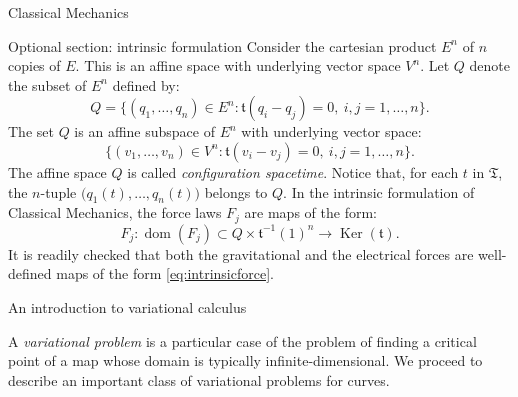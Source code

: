 \documentclass[oneside,a4paper,11pt]{amsbook}
\DeclareMathOperator{\Ker}{Ker}
\DeclareMathOperator{\Dom}{dom}
\theoremstyle{remark}\newtheorem{exercise}{Exercise}[chapter]
\theoremstyle{plain}\newtheorem{teo}{Theorem}[section]
\theoremstyle{plain}\newtheorem{lem}[teo]{Lemma}
\theoremstyle{plain}\newtheorem{prop}[teo]{Proposition}
\theoremstyle{plain}\newtheorem{cor}[teo]{Corollary}
\theoremstyle{definition}\newtheorem{defin}[teo]{Definition}
\theoremstyle{remark}\newtheorem{rem}[teo]{Remark}
\theoremstyle{definition}\newtheorem{notation}[teo]{Notation}
\theoremstyle{definition}\newtheorem{convention}[teo]{Convention}
\theoremstyle{definition}\newtheorem{example}[teo]{Example}
\numberwithin{section}{chapter}
\numberwithin{equation}{section}
\begin{document}
\begin{chapter}{Classical Mechanics}
\begin{section}{Optional section: intrinsic formulation}
Consider the cartesian product $E^n$ of $n$ copies of $E$. This is an affine space with underlying vector
space $V^n$. Let $Q$ denote the subset of $E^n$ defined by:
\[Q=\big\{(q_1,\ldots,q_n)\in E^n:\mathfrak t(q_i-q_j)=0,\ i,j=1,\ldots,n\big\}.\]
The set $Q$ is an affine subspace of $E^n$ with underlying vector space:
\[\big\{(v_1,\ldots,v_n)\in V^n:\mathfrak t(v_i-v_j)=0,\ i,j=1,\ldots,n\big\}.\]
The affine space $Q$ is called {\em configuration spacetime}. Notice that, for each $t$ in $\mathfrak T$,
the $n$-tuple $\big(q_1(t),\ldots,q_n(t)\big)$ belongs to $Q$. In the intrinsic formulation of Classical Mechanics,
the force laws $F_j$ are maps of the form:
\begin{equation}\label{eq:intrinsicforce}
F_j:\Dom(F_j)\subset Q\times\mathfrak t^{-1}(1)^n\longrightarrow\Ker(\mathfrak t).
\end{equation}
It is readily checked that both the gravitational and the electrical forces are well-defined maps
of the form \eqref{eq:intrinsicforce}.

\end{section}

\begin{section}{An introduction to variational calculus}
\label{sec:introvariations}

A {\em variational problem\/} is a particular case of the problem of finding a critical point of a map
whose domain is typically infinite-dimensional. We proceed to describe an important class of variational problems
for curves.


\end{section}
\end{chapter}
\end{document}
